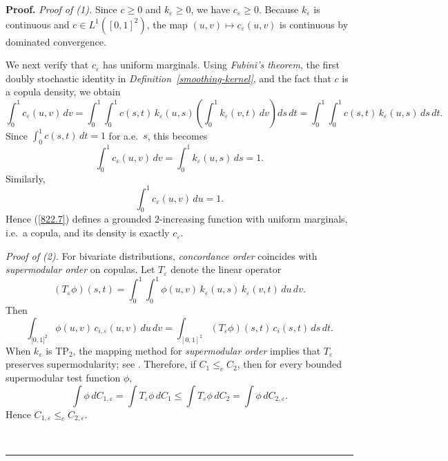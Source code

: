 \documentclass[onecolumn]{article}
\newenvironment{proof}[1][Proof]{\noindent\textbf{#1.} }{\ \rule{0.5em}{0.5em}}
\begin{document}
\begin{proof}
\noindent \emph{Proof of (1).} Since $c\geq 0$ and $k_{\varepsilon }\geq 0$,
we have $c_{\varepsilon }\geq 0$. Because $k_{\varepsilon }$ is continuous
and $c\in L^{1}([0,1]^{2})$, the map $(u,v)\mapsto c_{\varepsilon }(u,v)$ is
continuous by dominated convergence.

We next verify that $c_{\varepsilon }$ has uniform marginals. Using \textit{%
Fubini's theorem}, the first doubly stochastic identity in \textit{%
Definition~\ref{smoothing-kernel}}, and the fact that $c$ is a copula
density, we obtain 
\begin{equation}
\int_{0}^{1}c_{\varepsilon
}(u,v)\,dv=\int_{0}^{1}\int_{0}^{1}c(s,t)\,k_{\varepsilon }(u,s)\left(
\int_{0}^{1}k_{\varepsilon }(v,t)\,dv\right)
ds\,dt=\int_{0}^{1}\int_{0}^{1}c(s,t)\,k_{\varepsilon }(u,s)\,ds\,dt.
\label{822.6}
\end{equation}%
Since $\int_{0}^{1}c(s,t)\,dt=1$ for a.e.\ $s$, this becomes 
\begin{equation}
\int_{0}^{1}c_{\varepsilon }(u,v)\,dv=\int_{0}^{1}k_{\varepsilon
}(u,s)\,ds=1.  \label{822.7}
\end{equation}%
Similarly, 
\begin{equation}
\int_{0}^{1}c_{\varepsilon }(u,v)\,du=1.  \label{822.8}
\end{equation}%
Hence (\ref{822.7}) defines a grounded $2$-increasing function with uniform
marginals, i.e.\ a copula, and its density is exactly $c_{\varepsilon }$.

\medskip \noindent \emph{Proof of (2).} For bivariate distributions, \textit{%
concordance order} coincides with \textit{supermodular order} on copulas.
Let $T_{\varepsilon }$ denote the linear operator 
\begin{equation}
(T_{\varepsilon }\phi )(s,t)=\int_{0}^{1}\int_{0}^{1}\phi
(u,v)\,k_{\varepsilon }(u,s)\,k_{\varepsilon }(v,t)\,du\,dv.  \label{822.9}
\end{equation}%
Then 
\begin{equation}
\int_{\lbrack 0,1]^{2}}\phi (u,v)\,c_{i,\varepsilon
}(u,v)\,du\,dv=\int_{[0,1]^{2}}(T_{\varepsilon }\phi
)(s,t)\,c_{i}(s,t)\,ds\,dt.  \label{822.10}
\end{equation}%
When $k_{\varepsilon }$ is $\mathrm{TP}_{2}$, the mapping method for \textit{%
supermodular order} implies that $T_{\varepsilon }$ preserves
supermodularity; see \cite[Chapter~3.9 and Section~4.3.2]{[28]}. Therefore,
if $C_{1}\leq _{c}C_{2}$, then for every bounded supermodular test function $%
\phi $, 
\begin{equation}
\int \phi \,dC_{1,\varepsilon }=\int T_{\varepsilon }\phi \,dC_{1}\leq \int
T_{\varepsilon }\phi \,dC_{2}=\int \phi \,dC_{2,\varepsilon }.
\label{822.11}
\end{equation}%
Hence $C_{1,\varepsilon }\leq _{c}C_{2,\varepsilon }$.


\end{proof}
\end{document}
